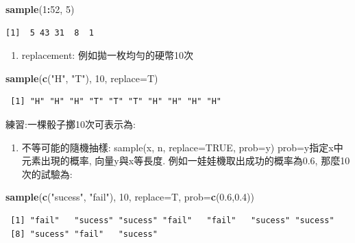 \documentclass[]{book}
\newenvironment{Shaded}{\begin{snugshade}}{\end{snugshade}}
\newcommand{\DataTypeTok}[1]{\textcolor[rgb]{0.13,0.29,0.53}{#1}}
\newcommand{\DecValTok}[1]{\textcolor[rgb]{0.00,0.00,0.81}{#1}}
\newcommand{\FloatTok}[1]{\textcolor[rgb]{0.00,0.00,0.81}{#1}}
\newcommand{\KeywordTok}[1]{\textcolor[rgb]{0.13,0.29,0.53}{\textbf{#1}}}
\newcommand{\NormalTok}[1]{#1}
\newcommand{\OperatorTok}[1]{\textcolor[rgb]{0.81,0.36,0.00}{\textbf{#1}}}
\newcommand{\StringTok}[1]{\textcolor[rgb]{0.31,0.60,0.02}{#1}}
\providecommand{\tightlist}{%
  \setlength{\itemsep}{0pt}\setlength{\parskip}{0pt}}
\theoremstyle{definition}
\theoremstyle{definition}
\theoremstyle{definition}
\theoremstyle{remark}
\begin{document}
\begin{Shaded}
\begin{Highlighting}[]
\KeywordTok{sample}\NormalTok{(}\DecValTok{1}\OperatorTok{:}\DecValTok{52}\NormalTok{, }\DecValTok{5}\NormalTok{)}
\end{Highlighting}
\end{Shaded}

\begin{verbatim}
[1]  5 43 31  8  1
\end{verbatim}

\begin{enumerate}
\def\labelenumi{\arabic{enumi}.}
\setcounter{enumi}{1}
\tightlist
\item
  replacement: 例如拋一枚均勻的硬幣10次
\end{enumerate}

\begin{Shaded}
\begin{Highlighting}[]
 \KeywordTok{sample}\NormalTok{(}\KeywordTok{c}\NormalTok{(}\StringTok{"H"}\NormalTok{, }\StringTok{"T"}\NormalTok{), }\DecValTok{10}\NormalTok{, }\DataTypeTok{replace=}\NormalTok{T)}
\end{Highlighting}
\end{Shaded}

\begin{verbatim}
 [1] "H" "H" "H" "T" "T" "T" "H" "H" "H" "H"
\end{verbatim}

練習:一棵骰子擲10次可表示為:

\begin{enumerate}
\def\labelenumi{\arabic{enumi})}
\setcounter{enumi}{2}
\tightlist
\item
  不等可能的隨機抽樣: sample(x, n, replace=TRUE, prob=y)
  prob=y指定x中元素出現的概率, 向量y與x等長度.
  例如一娃娃機取出成功的概率為0.6, 那麼10次的試驗為:
\end{enumerate}

\begin{Shaded}
\begin{Highlighting}[]
\KeywordTok{sample}\NormalTok{(}\KeywordTok{c}\NormalTok{(}\StringTok{"sucess"}\NormalTok{, }\StringTok{"fail"}\NormalTok{), }\DecValTok{10}\NormalTok{, }\DataTypeTok{replace=}\NormalTok{T, }\DataTypeTok{prob=}\KeywordTok{c}\NormalTok{(}\FloatTok{0.6}\NormalTok{,}\FloatTok{0.4}\NormalTok{))}
\end{Highlighting}
\end{Shaded}

\begin{verbatim}
 [1] "fail"   "sucess" "sucess" "fail"   "fail"   "sucess" "sucess"
 [8] "sucess" "fail"   "sucess"
\end{verbatim}
\end{document}
